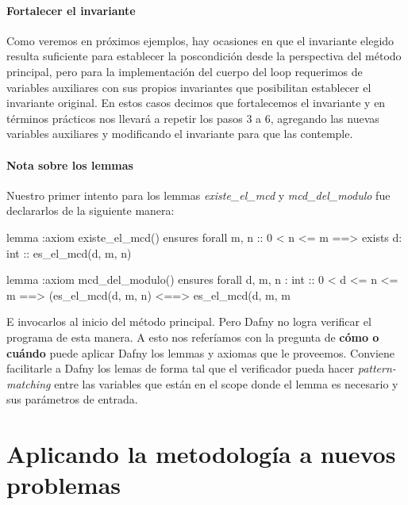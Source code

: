 \documentclass[12pt, a4paper, openany, fleqn]{book}
\begin{document}
    \begin{greenbox}
    \end{greenbox}

    \subsubsection{Fortalecer el invariante}
    Como veremos en próximos ejemplos, hay ocasiones en que el invariante elegido resulta suficiente para establecer la poscondición desde la perspectiva del método principal, pero para la implementación del cuerpo del loop requerimos de variables auxiliares con sus propios invariantes que posibilitan establecer el invariante original.
    En estos casos decimos que fortalecemos el invariante y en términos prácticos nos llevará a repetir los pasos 3 a 6, agregando las nuevas variables auxiliares y modificando el invariante para que las contemple.

    \subsubsection{Nota sobre los lemmas}
    Nuestro primer intento para los lemmas \textit{existe\_el\_mcd} y \textit{mcd\_del\_modulo} fue declararlos de la siguiente manera:

    \begin{greenbox}
    \begin{dafny}[gobble=8]
        lemma {:axiom} existe_el_mcd()
            ensures forall m, n :: 0 < n <= m ==>
                exists d: int :: es_el_mcd(d, m, n)

        lemma {:axiom} mcd_del_modulo()
            ensures forall d, m, n : int :: 0 < d <= n <= m ==>
                (es_el_mcd(d, m, n) <==> es_el_mcd(d, m, m %
    \end{dafny}
    \end{greenbox}

    E invocarlos al inicio del método principal. Pero Dafny no logra verificar el programa de esta manera. A esto nos referíamos con la pregunta de \textbf{cómo o cuándo} puede aplicar Dafny los lemmas y axiomas que le proveemos. Conviene facilitarle a Dafny los lemas de forma tal que el verificador pueda hacer \textit{pattern-matching} entre las variables que están en el scope donde el lemma es necesario y sus parámetros de entrada.

    \chapter{Aplicando la metodología a nuevos problemas}
\end{document}
